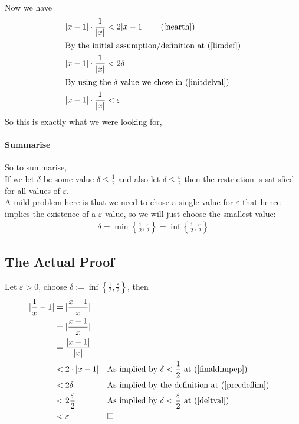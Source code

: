 \documentclass[class=article, crop=false]{standalone}
\begin{document}
Now we have 
\begin{align}
  \lvert x-1 \rvert \cdot   \frac{1}{\lvert x \rvert} &< 2 \lvert x-1 \rvert \tag{\ref{nearth}}\\
  \intertext{By the initial assumption/definition at (\ref{limdef})}
    \lvert x-1 \rvert \cdot   \frac{1}{\lvert x \rvert} &< 2 \delta \\
    \intertext{By using the $\delta$ value we chose in (\ref{initdelval})}
  \lvert x-1 \rvert \cdot   \frac{1}{\lvert x \rvert} &< \varepsilon \label{finaldimpep}
\end{align}
So this is exactly what we were looking for,
\paragraph{Summarise} So to summarise, \\
If we let $\delta$ be some value $\delta \leq \frac{1}{2}$ and also let $\delta \leq \frac{\varepsilon}{2}$ then the restriction is satisfied for all values of $\varepsilon$. \\

A mild problem here is that we need to chose a single value for $\varepsilon$ that hence implies the existence of a $\varepsilon$ value, so we will just choose the smallest value:
\begin{align}
  \delta = \min \left\{ \frac{1}{2}, \frac{\varepsilon}{2} \right\} = \inf \left\{ \frac{1}{2}, \frac{\varepsilon}{2} \right\} \label{deltval}
\end{align}

\newpage
\subsection{The Actual Proof}
Let $\varepsilon>0$, choose $\delta := \inf \left\{ \frac{1}{2}, \frac{\varepsilon}{2} \right\}$, then \\

\begin{align}
  \lvert \frac{1}{x} - 1 \rvert &= \lvert \frac{x-1}{x} \rvert \notag \\
                                &= \lvert \frac{x-1}{x} \rvert \notag \\
                                &= \frac{\lvert x-1 \rvert}{\lvert x \rvert} \notag \\
                                &< 2 \cdot \lvert x-1 \rvert \notag && \text{As implied by $\delta < \frac{1}{2}$ at (\ref{finaldimpep})}\\
                                & < 2 \delta \notag && \text{As implied by the definition at (\ref{precdeflim})} \\
                                &< 2 \frac{\varepsilon}{2} \notag && \text{As implied by $\delta < \frac{\varepsilon}{2}$ at (\ref{deltval})} \\
                                &< \varepsilon && \text{$\square$}
\end{align}
\end{document}
